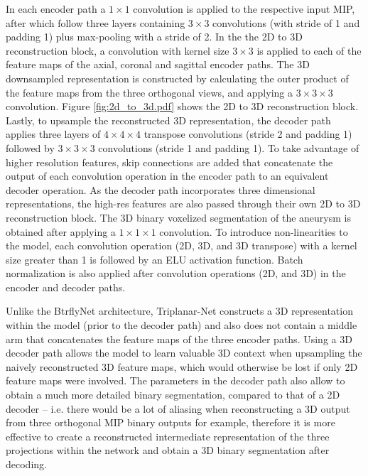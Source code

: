 In each encoder path a $1 \times 1$ convolution is applied to the respective input MIP, after which follow three layers containing $3 \times 3$ convolutions (with stride of 1 and padding 1) plus max-pooling with a stride of 2. 
In the the 2D to 3D reconstruction block, a convolution with kernel size $3 \times 3$ is applied to each of the feature maps of the axial, coronal and sagittal encoder paths. The 3D downsampled representation is constructed by calculating the outer product of the feature maps from the three orthogonal views, and applying a $3 \times 3 \times 3$ convolution. Figure \ref{fig:2d_to_3d.pdf} shows the 2D to 3D reconstruction block.
Lastly, to upsample the reconstructed 3D representation, the decoder path applies three layers of $4 \times 4 \times 4$ transpose convolutions (stride 2 and padding 1) followed by $3 \times 3 \times 3$ convolutions (stride 1 and padding 1). To take advantage of higher resolution features, skip connections are added that concatenate the output of each convolution operation in the encoder path to an equivalent decoder operation. As the decoder path incorporates three dimensional representations, the high-res features are also passed through their own 2D to 3D reconstruction block. The 3D binary voxelized segmentation of the aneurysm is obtained after applying a $1 \times 1 \times 1$ convolution. To introduce non-linearities to the model, each convolution operation (2D, 3D, and 3D transpose) with a kernel size greater than 1 is followed by an ELU activation function. Batch normalization is also applied after convolution operations (2D, and 3D) in the encoder and decoder paths.

Unlike the BtrflyNet architecture, Triplanar-Net constructs a 3D representation within the model (prior to the decoder path) and also does not contain a middle arm that concatenates the feature maps of the three encoder paths. Using a 3D decoder path allows the model to learn valuable 3D context when upsampling the naively reconstructed 3D feature maps, which would otherwise be lost if only 2D feature maps were involved. The parameters in the decoder path also allow to obtain a much more detailed binary segmentation, compared to that of a 2D decoder -- i.e. there would be a lot of aliasing when reconstructing a 3D output from three orthogonal MIP binary outputs for example, therefore it is more effective to create a reconstructed intermediate representation of the three projections within the network and obtain a 3D binary segmentation after decoding. 

